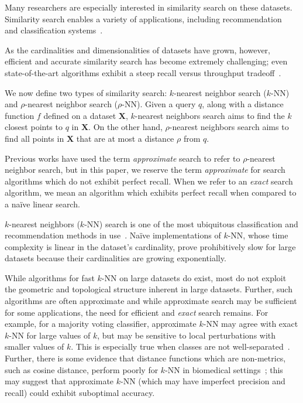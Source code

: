 Many researchers are especially interested in similarity search on these datasets. 
Similarity search enables a variety of applications, including recommendation~\cite{annoy} and classification systems~\cite{suyanto2022knnclassifier}. 

As the cardinalities and dimensionalities of datasets have grown, however, efficient and accurate similarity search has become extremely challenging; 
even state-of-the-art algorithms exhibit a steep recall versus throughput tradeoff~\cite{ishaq2019clustered}.

We now define two types of similarity search: $k$-nearest neighbor search ($k$-NN) and $\rho$-nearest neighbor search ($\rho$-NN). 
Given a query $q$, along with a distance function $f$ defined on a dataset $\textbf{X}$, $k$-nearest neighbors search 
aims to find the $k$ closest points to $q$ in $ \textbf{X}$.
On the other hand, $\rho$-nearest neighbors search aims to find all points in $\textbf{X}$ that are at most a distance $\rho$ from $q$.


Previous works have used the term \emph{approximate} search to refer to $\rho$-nearest neighbor search, but in this paper, 
we reserve the term \emph{approximate} for search algorithms which do not exhibit perfect recall.
When we refer to an \emph{exact} search algorithm, we mean an algorithm which exhibits perfect recall when compared to a na\"{i}ve linear search.


$k$-nearest neighbors ($k$-NN) search is one of the most ubiquitous classification and recommendation methods in use~\cite{fix1952discriminatory, cover1967nearest}. 
Na\"{i}ve implementations of $k$-NN, whose time complexity is linear in the dataset's cardinality, prove prohibitively slow for large datasets because their cardinalities are growing exponentially.


While algorithms for fast $k$-NN on large datasets do exist, most do not exploit the geometric and topological structure inherent in large datasets.
Further, such algorithms are often approximate and while approximate search may be sufficient for some applications, the need for efficient and \emph{exact} search remains.
For example, for a majority voting classifier, approximate $k$-NN may agree with exact $k$-NN for large values of $k$, but may be sensitive to local perturbations with smaller values of $k$.
This is especially true when classes are not well-separated~\cite{zhang2022imbalanced}.
Further, there is some evidence that distance functions which are non-metrics, such as cosine distance, perform poorly for $k$-NN in biomedical settings~\cite{hu2016distance};
this may suggest that approximate $k$-NN (which may have imperfect precision and recall) could exhibit suboptimal accuracy.

